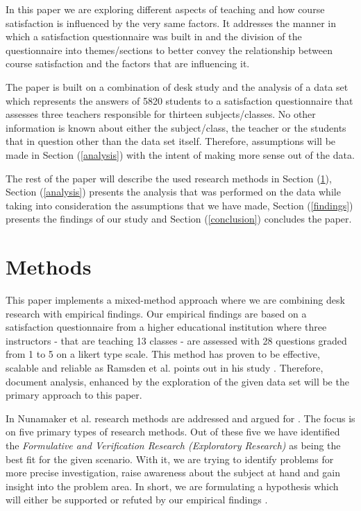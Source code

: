 \documentclass[twocolumn]{article}
\begin{document}
In this paper we are exploring different aspects of teaching and how course satisfaction is influenced by the very same factors. It addresses the manner in which a satisfaction questionnaire was built in and the division of the questionnaire into themes/sections to better convey the relationship between course satisfaction and the factors that are influencing it.

The paper is built on a combination of desk study and the analysis of a data set which represents the answers of 5820 students to a satisfaction questionnaire that assesses three teachers responsible for thirteen subjects/classes. No other information is known about either the subject/class, the teacher or the  students that in question other than the data set itself. Therefore, assumptions will be made in Section (\ref{analysis}) with the intent of making more sense out of the data.

The rest of the paper will describe the used research methods in Section (\ref{methods}), Section (\ref{analysis}) presents the analysis that was performed on the data while taking into consideration the assumptions that we have made, Section (\ref{findings}) presents the findings of our study and Section (\ref{conclusion}) concludes the paper.

\section{Methods} \label{methods}

This paper implements a mixed-method approach where we are combining desk research with empirical findings. Our empirical findings are based on a satisfaction questionnaire from a higher educational institution where three instructors - that are teaching 13 classes - are assessed with 28 questions graded from 1 to 5 on a likert type scale. This method has proven to be effective, scalable and reliable as Ramsden et al. points out in his study \cite{Ramsden1991}. Therefore, document analysis, enhanced by the exploration of the given data set will be the primary approach to this paper.

In Nunamaker et al. research methods are addressed and argued for \cite{Nunamaker}. The focus is on five primary types of research methods. Out of these five we have identified the \textit{Formulative and Verification Research (Exploratory Research)} as being the best fit for the given scenario. With it, we are trying to identify problems for more precise investigation, raise awareness about the subject at hand and gain insight into the problem area. In short, we are formulating a hypothesis which will either be supported or refuted by our empirical findings \cite{Nunamaker}.
\end{document}

